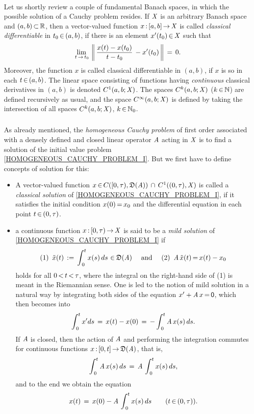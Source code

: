 \documentclass[11pt,twoside]{article}
\begin{document}
\paragraph{} %
Let us shortly review a couple of fundamental Banach spaces,
in which the possible solution of a Cauchy problem resides.
If $\mathit{X}$ is an arbitrary Banach space and $(a,b) {\,\subset\,} {\mathbb{R}}$,
then a vector-valued function $x {\,:\,} [a,b] {\,\to\,} \mathit{X}$
is called \textit{classical differentiable} in $t_0 {\,\in\,} (a,b)$,
if there is an element $x'(t_0) {\,\in\,} \mathit{X}$ such that
\[
\lim_{\,t {\,\to\,} t_0} \,
\left\lVert  \, \frac{x(t)-x(t_0)}{t-t_0}\, - x'(t_0) \,  \right\rVert \,=\, 0.
\]
Moreover,
the function $x$ is called {classical differentiable in} $(a,b)$,
if $x$ is so in each $t {\,\in\,} (a,b)$.
The linear space consisting of functions having \textit{continuous}
classical derivatives in $(a,b)$ is denoted $C^1(a,b;\mathit{X})$.
The spaces $C^k(a,b;\mathit{X})$ ($k {\,\in\,} {\mathbb{N}}$) are defined recursively as usual,
and the space $C^{\infty}(a,b;\mathit{X})$ is defined
by taking the intersection of all spaces $C^k(a,b;\mathit{X})$,
$k {\,\in\,} {\mathbb{N}}_0$.

\subparagraph{} %
As already mentioned,
the \textit{homogeneous Cauchy problem} of first order associated with
a densely defined and closed linear operator $\mathit{A}$ acting in $\mathit{X}$
is to find a solution
of the initial value problem \eqref{HOMOGENEOUS_CAUCHY_PROBLEM_I}.
But we first have to define concepts of solution for this:

\begin{itemize}[leftmargin=4mm]
\item[1.]
A vector-valued function
$x {\,\in\,} C([0,\tau),\mathfrak{D}(\mathit{A})) \, \cap \, C^1((0,\tau),\mathit{X})$
is called a \textit{classical solution} of \eqref{HOMOGENEOUS_CAUCHY_PROBLEM_I},
if it satisfies the initial condition $x(0) {\,=\,} x_0$
and the differential equation in each point $t {\,\in\,} (0,\tau)$.

\item[2.]
a continuous function $x {\,:\,} [0,\tau) {\,\to\,} \mathit{X}$ is said to be
a \textit{mild solution} of \eqref{HOMOGENEOUS_CAUCHY_PROBLEM_I} if
\[
\mbox{(1) } \, \tilde{x}(t) \,:=\,
\int_{\,0}^t x(s) \, ds \, {\,\in\,} \mathfrak{D}(\mathit{A})
\quad \mbox{ and } \quad
\mbox{(2) } \, \mathit{A} \, \tilde{x}(t) {\,=\,} x(t)-x_0
\]
holds for all $0 {\,<\,} t {\,<\,} \tau$,
where the integral on the right-hand side of (1) 
is meant in the Riemannian sense.
One is led to the notion of mild solution in a natural way
by integrating both sides of the equation $x' + \mathit{A} \, x {\,=\,} {\mathsf{0}}$,
which then becomes into
\[
\int_{\,0}^t x' ds \,=\,
x(t)-x(0) \,=\, -
\int_{\,0}^t \mathit{A} \, x(s) \, ds.
\]
If $\mathit{A}$ is closed,
then the action of $\mathit{A}$ and performing the integration commutes
for continuous functions $x {\,:\,} [0,t] {\,\to\,} \mathfrak{D}(\mathit{A})$,
that is,
\[
\int_{\,0}^t \mathit{A} \, x(s) \, ds  \,=\, \mathit{A} \, \int_{\,0}^t x(s) \, ds,
\]
and to the end we obtain the equation
\[
x(t) \,=\, x(0) - \mathit{A} \, \int_{\,0}^t x(s) \,ds
\quad \quad (t {\,\in\,} (0,\tau)).
\]
\end{itemize}
\end{document}
